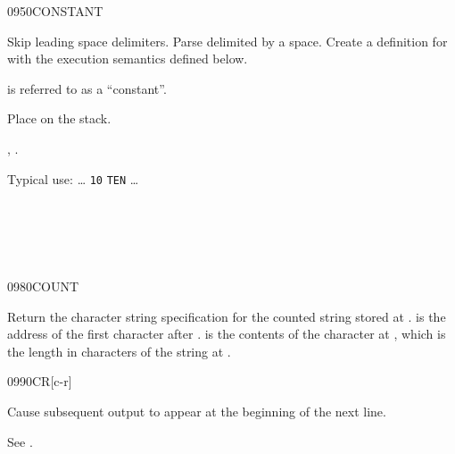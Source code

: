 \vspace*{-6ex}
\begin{worddef}{0950}{CONSTANT}
\item {}

	Skip leading space delimiters. Parse  delimited by
	a space. Create a definition for  with the execution
	semantics defined below.

	 is referred to as a ``constant''.

\execute[name]

	Place  on the stack.

\see {},
	.

	\begin{rationale} %
		Typical use: {\ldots}
			 \texttt{10}  \texttt{TEN}
			{\ldots}
	\end{rationale}

	\begin{testing} %
		 \\

		 \\
		 \\
	\end{testing}
\end{worddef}

\vspace*{-3ex}
\begin{worddef}{0980}{COUNT}
\item {}

	Return the character string specification for the counted
	string stored at .  is the
	address of the first character after . 
	is the contents of the character at , which is
	the length in characters of the string at .

	\begin{testing} %
	\end{testing}
\end{worddef}

\vspace*{-3ex}
\begin{worddef}{0990}{CR}[c-r]
\item \stack{}{}

	Cause subsequent output to appear at the beginning of the next
	line.

	\begin{testing} %
		See .
	\end{testing}
\end{worddef}

